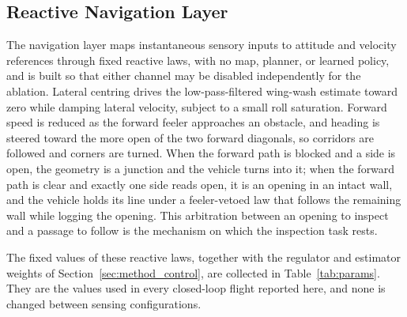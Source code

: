 \documentclass[final,5p,times]{elsarticle}
\begin{document}
\subsection{Reactive Navigation Layer}
\label{sec:method_nav}

The navigation layer maps instantaneous sensory inputs to attitude and velocity references through fixed reactive laws, with no map, planner, or learned policy, and is built so that either channel may be disabled independently for the ablation. Lateral centring drives the low-pass-filtered wing-wash estimate toward zero while damping lateral velocity, subject to a small roll saturation. Forward speed is reduced as the forward feeler approaches an obstacle, and heading is steered toward the more open of the two forward diagonals, so corridors are followed and corners are turned. When the forward path is blocked and a side is open, the geometry is a junction and the vehicle turns into it; when the forward path is clear and exactly one side reads open, it is an opening in an intact wall, and the vehicle holds its line under a feeler-vetoed law that follows the remaining wall while logging the opening. This arbitration between an opening to inspect and a passage to follow is the mechanism on which the inspection task rests.

The fixed values of these reactive laws, together with the regulator and estimator weights of Section~\ref{sec:method_control}, are collected in Table~\ref{tab:params}. They are the values used in every closed-loop flight reported here, and none is changed between sensing configurations.
\end{document}
